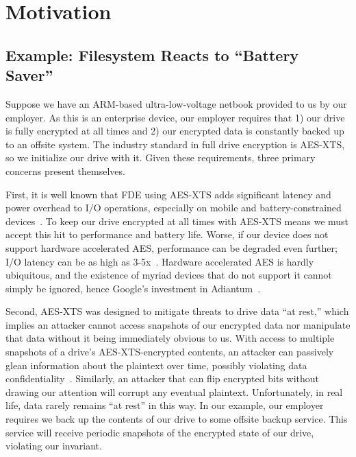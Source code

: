 \section{Motivation}\label{sec:motivation}

\subsection{Example: Filesystem Reacts to ``Battery Saver''}


Suppose we have an ARM-based ultra-low-voltage netbook provided to us by our
employer. As this is an enterprise device, our employer requires that 1) our
drive is fully encrypted at all times and 2) our encrypted data is constantly
backed up to an offsite system. The industry standard in full drive encryption
is AES-XTS, so we initialize our drive with it. Given these requirements,
three primary concerns present themselves.

First, it is well known that FDE using AES-XTS adds significant latency and
power overhead to I/O operations, especially on mobile and battery-constrained
devices~\cite{google-engadget, android-M-mobile-motivation,
android-M-mobile-motivation-2}. To keep our drive encrypted at all times with
AES-XTS means we must accept this hit to performance and battery life. Worse, if
our device does not support hardware accelerated AES, performance can be
degraded even further; I/O latency can be as high as 3-5x~\cite{StrongBox}.
Hardware accelerated AES is hardly ubiquitous, and the existence of myriad
devices that do not support it cannot simply be ignored, hence Google's
investment in Adiantum~\cite{Adiantum}.

Second, AES-XTS was designed to mitigate threats to drive data ``at rest,''
which implies an attacker cannot access snapshots of our encrypted data nor
manipulate that data without it being immediately obvious to us. With access to
multiple snapshots of a drive's AES-XTS-encrypted contents, an attacker can
passively glean information about the plaintext over time, possibly violating
data confidentiality~\cite{XEX, XTS}. Similarly, an attacker that can flip
encrypted bits without drawing our attention will corrupt any eventual
plaintext. Unfortunately, in real life, data rarely remains ``at rest'' in this
way. In our example, our employer requires we back up the contents of our drive
to some offsite backup service. This service will receive periodic snapshots of
the encrypted state of our drive, violating our invariant.

